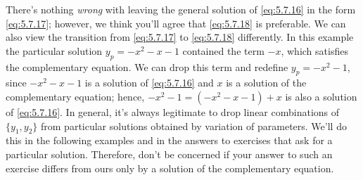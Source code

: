 \documentclass{ximera}
\begin{document}
There's nothing \textit{wrong} with leaving the general solution of
\eqref{eq:5.7.16} in the form \eqref{eq:5.7.17};     however, we think
you'll agree that \eqref{eq:5.7.18} is preferable. We can also view the
transition from \eqref{eq:5.7.17} to \eqref{eq:5.7.18} differently. In
this example the particular solution $y_p=-x^2-x-1$ contained the term
$-x$, which satisfies the complementary equation. We can
 drop this term and redefine $y_p=-x^2-1$, since
 $-x^2-x-1$ is a solution of \eqref{eq:5.7.16} and $x$ is a solution
of the complementary equation; hence, $-x^2-1=(-x^2-x-1)+x$
is also a solution of \eqref{eq:5.7.16}. In general, it's always
legitimate to drop linear combinations of $\{y_1,y_2\}$ from
particular solutions obtained by variation of parameters.
We'll do this in the following  examples and in the answers to
exercises that ask  for a particular solution. Therefore, don't be
concerned if your answer to such an exercise differs from ours only by
a solution of the complementary equation.
 
\end{document}
